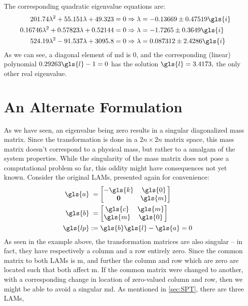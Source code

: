 The corresponding quadratic eigenvalue equations are:
\begin{align}
201.74\lambda^2 + 55.151\lambda + 49.323 = 0 &\Rightarrow \lambda = -0.13669 \pm 0.47519\gls{i}\\
0.16746\lambda^2 + 0.57823\lambda + 0.52144 = 0 &\Rightarrow \lambda = -1.7265 \pm 0.3649\gls{i}\\
524.19\lambda^2 - 91.537\lambda + 3095.8 = 0 &\Rightarrow \lambda = 0.087312 \pm 2.4286\gls{i}
\end{align}
As we can see, a diagonal element of \gls{md} is 0, and the 
corresponding (linear) polynomial $0.29263\gls{l} - 1 = 0$ has 
the solution $\gls{l} =3.4173,$ the only other real eigenvalue. 

\section{An Alternate Formulation}
As we have seen, an eigenvalue being zero results in a singular 
diagonalized mass matrix. Since the transformation is done in a 
$2n\times2n$ matrix space, this mass matrix doesn't correspond to a 
physical mass, but rather to a amalgam of the system properties. While the 
singularity of the mass matrix does not pose a computational problem so 
far, this oddity might have consequences not yet known. Consider the 
original LAMs, presented again for convenience:
\begin{align}
	\gls{a} &\phantom{:}= \begin{bmatrix}
	-\gls{k} & \gls{0}\\
	\mathbf{0} & \gls{m}
	\end{bmatrix}\\
	\quad\gls{b} &\phantom{:}= \begin{bmatrix}
	\gls{c} & \gls{m}\\
	\gls{m} & \gls{0}
	\end{bmatrix}\\	
	\gls{lp} &:= \gls{b}\gls{l} - \gls{a} = 0
\end{align}
As seen in the example above, the transformation matrices are also 
singular -- in fact, they have respectively a column and a row entirely 
zero. Since the common matrix to both LAMs is \gls{m}, and further the 
column and row which are zero are located such that both affect \gls{m}. 
If the common matrix were changed to another, with a corresponding change 
in location of zero-valued column and row, then we might be able to avoid 
a singular \gls{md}. As mentioned in \autoref{sec:SPT}, there are three LAMs, 
